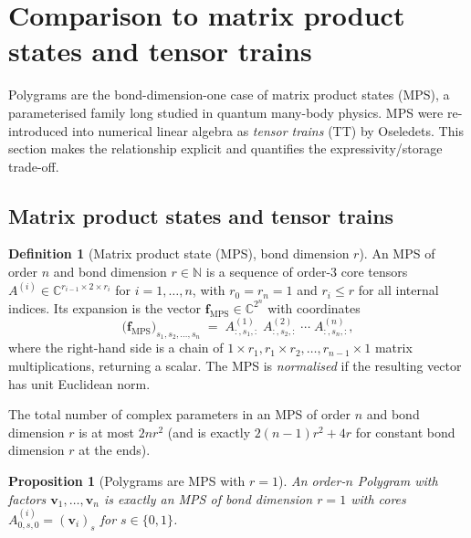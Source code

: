 \documentclass[11pt,letterpaper]{article}
\newtheorem{proposition}[theorem]{Proposition}
\theoremstyle{definition}
\newtheorem{definition}[theorem]{Definition}
\newcommand{\C}{\mathbb{C}}
\newcommand{\N}{\mathbb{N}}
\begin{document}
\section{Comparison to matrix product states and tensor trains}
\label{sec:mps}

Polygrams are the bond-dimension-one case of matrix product states (MPS), a
parameterised family long studied in quantum many-body physics. MPS were
re-introduced into numerical linear algebra as \emph{tensor trains} (TT) by
Oseledets. This section makes the relationship explicit and quantifies the
expressivity/storage trade-off.

\subsection{Matrix product states and tensor trains}

\begin{definition}[Matrix product state (MPS), bond dimension $r$]
\label{def:mps}
An MPS of order $n$ and bond dimension $r \in \N$ is a sequence of order-$3$
core tensors $A^{(i)} \in \C^{r_{i - 1} \times 2 \times r_{i}}$ for
$i = 1, \dots, n$, with $r_{0} = r_{n} = 1$ and $r_{i} \leq r$ for all
internal indices. Its expansion is the vector $\bm{f}_{\mathrm{MPS}} \in
\C^{2^{n}}$ with coordinates
\[
\big(\bm{f}_{\mathrm{MPS}}\big)_{s_{1}, s_{2}, \dots, s_{n}}
   \;=\;
   A^{(1)}_{:, s_{1}, :}\; A^{(2)}_{:, s_{2}, :}\; \cdots\; A^{(n)}_{:, s_{n}, :},
\]
where the right-hand side is a chain of $1 \times r_{1}, r_{1} \times r_{2},
\dots, r_{n-1} \times 1$ matrix multiplications, returning a scalar. The MPS
is \emph{normalised} if the resulting vector has unit Euclidean norm.
\end{definition}

The total number of complex parameters in an MPS of order $n$ and bond
dimension $r$ is at most $2 n r^{2}$ (and is exactly $2(n - 1)r^{2} + 4r$ for
constant bond dimension $r$ at the ends).

\begin{proposition}[Polygrams are MPS with $r = 1$]
\label{prop:polygram-is-mps}
An order-$n$ Polygram with factors $\bm{v}_{1}, \dots, \bm{v}_{n}$ is exactly
an MPS of bond dimension $r = 1$ with cores $A^{(i)}_{0, s, 0} = (\bm{v}_{i})_{s}$
for $s \in \{0, 1\}$.
\end{proposition}
\end{document}
